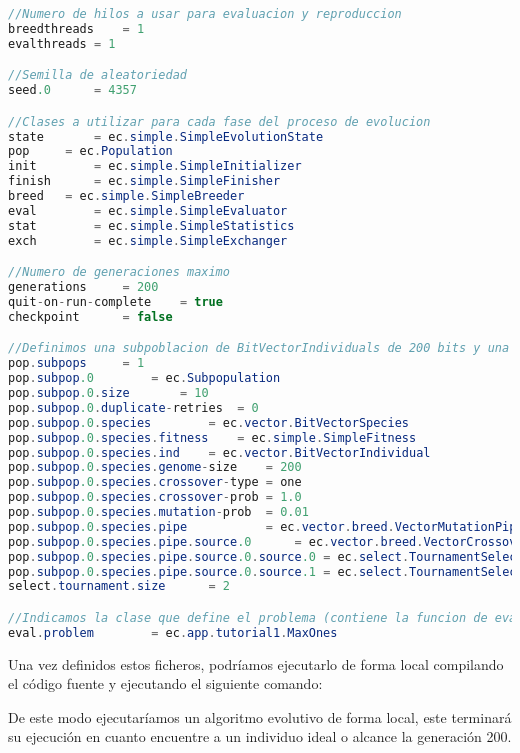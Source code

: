 \begin{lstlisting}[language=Java]
//Numero de hilos a usar para evaluacion y reproduccion
breedthreads	= 1
evalthreads	= 1

//Semilla de aleatoriedad
seed.0		= 4357

//Clases a utilizar para cada fase del proceso de evolucion
state		= ec.simple.SimpleEvolutionState
pop		= ec.Population
init		= ec.simple.SimpleInitializer
finish		= ec.simple.SimpleFinisher
breed	= ec.simple.SimpleBreeder
eval		= ec.simple.SimpleEvaluator
stat		= ec.simple.SimpleStatistics
exch		= ec.simple.SimpleExchanger

//Numero de generaciones maximo
generations		= 200
quit-on-run-complete	= true
checkpoint		= false

//Definimos una subpoblacion de BitVectorIndividuals de 200 bits y una reproduccion con seleccion por torneo de 2 individuos
pop.subpops		= 1
pop.subpop.0		= ec.Subpopulation
pop.subpop.0.size 		= 10
pop.subpop.0.duplicate-retries 	= 0
pop.subpop.0.species 		= ec.vector.BitVectorSpecies
pop.subpop.0.species.fitness 	= ec.simple.SimpleFitness
pop.subpop.0.species.ind	= ec.vector.BitVectorIndividual
pop.subpop.0.species.genome-size	= 200
pop.subpop.0.species.crossover-type	= one
pop.subpop.0.species.crossover-prob	= 1.0
pop.subpop.0.species.mutation-prob	= 0.01
pop.subpop.0.species.pipe			= ec.vector.breed.VectorMutationPipeline
pop.subpop.0.species.pipe.source.0		= ec.vector.breed.VectorCrossoverPipeline
pop.subpop.0.species.pipe.source.0.source.0	= ec.select.TournamentSelection
pop.subpop.0.species.pipe.source.0.source.1	= ec.select.TournamentSelection
select.tournament.size		= 2

//Indicamos la clase que define el problema (contiene la funcion de evaluacion)
eval.problem		= ec.app.tutorial1.MaxOnes
\end{lstlisting}

Una vez definidos estos ficheros, podríamos ejecutarlo de forma local compilando el código fuente y ejecutando el siguiente comando:


De este modo ejecutaríamos un algoritmo evolutivo de forma local, este terminar\'a su ejecución en cuanto encuentre a un individuo ideal o alcance la generación 200.

